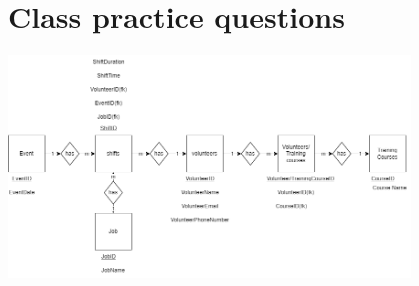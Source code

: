 \documentclass[12pt, a4, twoside]{article}
\begin{document}
\section{Class practice questions}
\begin{center}
  \includegraphics[width=0.8\textwidth]{ERD2.drawio}
\end{center}
\end{document}
